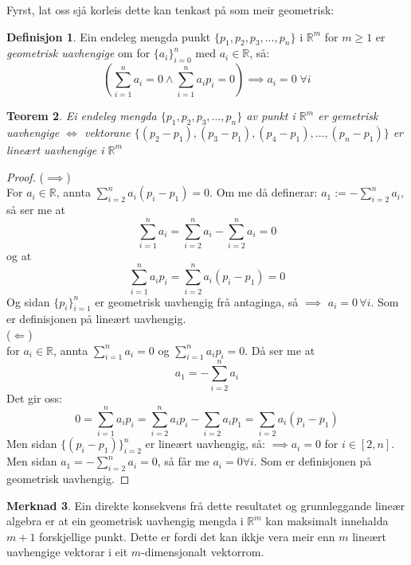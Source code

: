 \documentclass[a4paper, titlepage, 12pt, norsk]{article}
\theoremstyle{plain}
\newtheorem{theorem}{Teorem}[section]
\theoremstyle{definition}
\newtheorem{definition}[theorem]{Definisjon}
\newtheorem{remark}[theorem]{Merknad}
\newcommand{\Rb}{\mathbb{R}}
\begin{document}
\begin{theroem}
Fyrst, lat oss sjå korleis dette kan tenkast på som meir geometrisk:

\begin{definition}
	Ein endeleg mengda punkt $\{p_1, p_2, p_3, \dots, p_n\}$ i $\Rb^m$ for $m\geq1$ er \emph{geometrisk uavhengige} om for $\{a_i\}_{i=0}^n$ med $a_i\in\Rb$, så:
	\begin{equation*}
		\left(\sum_{i=1}^n a_i=0 \land  \sum_{i=1}^n a_ip_i=0\right)\implies a_i=0 \; \forall i
	\end{equation*}
\end{definition}

\begin{theorem}\label{thm:geometrisklineærtuavhengig}
	Ei endeleg mengda $\{p_1, p_2, p_3, \dots, p_n \}$ av punkt i $\Rb^m$ er gemetrisk uavhengige $\Longleftrightarrow$ vektorane $\{(p_2-p_1), (p_3-p_1), (p_4-p_1),\dots,(p_n-p_1)\}$ er lineært uavhengige i $\Rb^m$
\end{theorem}

\begin{proof}
	($\implies$)
	\\For $a_i\in\Rb$, annta $\sum_{i=2}^na_i(p_i-p_1)=0$. Om me då definerar: $a_1 := -\sum_{i=2}^na_i$, så ser me at 
	\begin{equation*}
		\sum_{i=1}^na_i=\sum_{i=2}^na_i-\sum_{i=2}^na_i=0
	\end{equation*}
	og at 
	\begin{equation*}
		\sum_{i=1}^na_ip_i=\sum_{i=2}^na_i(p_i-p_1)=0
	\end{equation*}
	Og sidan $\{p_i\}_{i=1}^n$ er geometrisk uavhengig frå antaginga, så $\implies$ $a_i=0 \, \forall i$. Som er definisjonen på lineært uavhengig.
	\\(\(\Longleftarrow\))
	\\for $a_i\in\Rb$, annta $\sum_{i=1}^n a_i=0$ og $\sum_{i=1}^n a_ip_i=0$. Då ser me at 
	\begin{equation*}
		a_1=-\sum_{i=2}^n a_i
	\end{equation*} 
	Det gir oss: 
	\begin{equation*}
		0=\sum_{i=1}^n a_ip_i=\sum_{i=2}^n a_ip_i-\sum_{i=2}a_ip_1=\sum_{i=2}a_i(p_i-p_1)
	\end{equation*}
	Men sidan $\{(p_i-p_1)\}_{i=2}^n$ er lineært uavhengig, så: $\implies a_i = 0$ for $i\in[2,n]$. Men sidan $a_1 = -\sum_{i=2}^n a_i=0$, så får me $a_i=0 \forall i$. Som er definisjonen på geometrisk uavhengig.
\end{proof}

\begin{remark}
	Ein direkte konsekvens frå dette resultatet og grunnleggande lineær algebra er at ein geometrisk uavhengig mengda i $\Rb^m$ kan maksimalt innehalda $m+1$ forskjellige punkt. Dette er fordi det kan ikkje vera meir enn $m$ lineært uavhengige vektorar i eit $m$-dimensjonalt vektorrom.
\end{remark}


\end{theroem}
\end{document}
